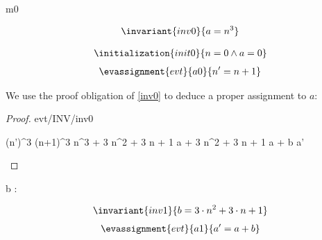 \documentclass[12pt]{amsart}
\title{}
\author{}
\date{} %
\begin{document}
\maketitle
\tableofcontents


\begin{machine}{m0}


\begin{align*}
\invariant{inv0}
{	a = n^3	}
\end{align*}
%


%
\begin{align*}
\initialization{init0}
{	n = 0 \land a = 0	}
\end{align*}
%
%
\begin{align*}
\evassignment{evt}{a0}
{	n' = n + 1	}
\end{align*}

We use the proof obligation of \ref{inv0} to deduce a proper assignment to $a$:

\begin{proof}{evt/INV/inv0}
	\begin{calculation}
		(n')^3
	\hint{=}{ \ref{a0} }
		(n+1)^3
		n^3 + 3 \cdot n^2 + 3 \cdot n + 1
	\hint{=}{ \ref{inv0} }
		a + 3 \cdot n^2 + 3 \cdot n + 1
		a + b
	\hint{=}{ \ref{a1} }
		a'
	\end{calculation}
\end{proof}

\begin{variable}
	b : \Int
\end{variable}

\begin{align*}
\invariant{inv1}
{	b = 3 \cdot n^2 + 3 \cdot n + 1	}
\end{align*}
\begin{align*}
\evassignment{evt}{a1}
{	a' = a + b	}
\end{align*}


\end{machine}
\end{document}
